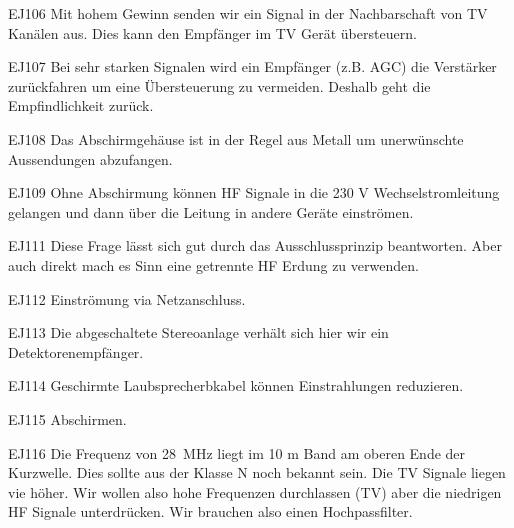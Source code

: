 \documentclass[10pt,a4paper,ngerman]{article}
\theoremstyle{definition}
\theoremstyle{plain}
\theoremstyle{mytheorem}
\theoremstyle{definition}
\begin{document}
\begin{sol}{EJ106}
Mit hohem Gewinn senden wir ein Signal in der Nachbarschaft von TV Kanälen aus. Dies kann den Empfänger im TV Gerät übersteuern.
\end{sol}

\begin{sol}{EJ107}
Bei sehr starken Signalen wird ein Empfänger (z.B. AGC) die Verstärker zurückfahren um eine Übersteuerung zu vermeiden.
Deshalb geht die Empfindlichkeit zurück.
\end{sol}

\begin{sol}{EJ108}
Das Abschirmgehäuse ist in der Regel aus Metall um unerwünschte Aussendungen abzufangen.
\end{sol}

\begin{sol}{EJ109}
Ohne Abschirmung können HF Signale in die 230 V Wechselstromleitung gelangen und dann über die Leitung in andere Geräte einströmen.
\end{sol}


\begin{sol}{EJ111}
Diese Frage lässt sich gut durch das Ausschlussprinzip beantworten. Aber auch direkt mach es Sinn eine getrennte HF Erdung zu verwenden.
\end{sol}

\begin{sol}{EJ112}
Einströmung via Netzanschluss.
\end{sol}

\begin{sol}{EJ113}
Die abgeschaltete Stereoanlage verhält sich hier wir ein Detektorenempfänger. 
\end{sol}

\begin{sol}{EJ114}
Geschirmte Laubsprecherbkabel können Einstrahlungen reduzieren.
\end{sol}

\begin{sol}{EJ115}
Abschirmen.
\end{sol}


\begin{sol}{EJ116}
Die Frequenz von \SI{28} {\mega\hertz } liegt im 10 m Band am oberen Ende der Kurzwelle. Dies sollte aus der Klasse N noch bekannt sein. Die TV Signale liegen vie höher. Wir wollen also hohe Frequenzen durchlassen (TV) aber die niedrigen HF Signale unterdrücken. Wir brauchen also einen Hochpassfilter.
\end{sol}
\end{document}

